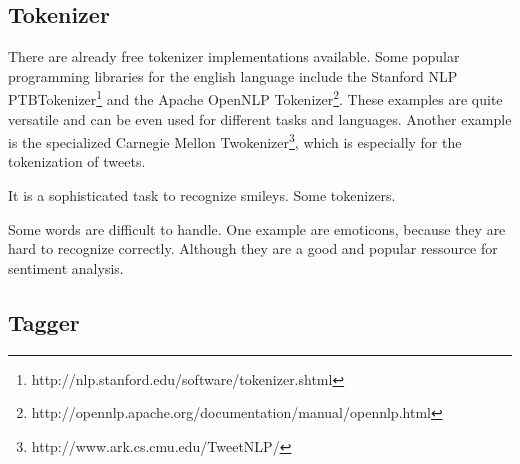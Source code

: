 \subsection{Tokenizer}
There are already free tokenizer implementations
 available. Some popular programming 
libraries for the english language include the Stanford 
NLP PTBTokenizer\footnote{http://nlp.stanford.edu/software/tokenizer.shtml} 
and the Apache OpenNLP Tokenizer\footnote{http://opennlp.apache.org/documentation/manual/opennlp.html}.
These examples are quite versatile and can be even 
used for different tasks and languages. Another 
example is the specialized Carnegie Mellon Twokenizer\footnote{http://www.ark.cs.cmu.edu/TweetNLP/},
which is especially for the tokenization of tweets.


It is a sophisticated task to recognize smileys. Some tokenizers.

Some words are difficult to handle. One example are emoticons,
because they are hard to recognize correctly. Although they 
are a good and popular ressource for sentiment analysis.


\subsection{Tagger}

